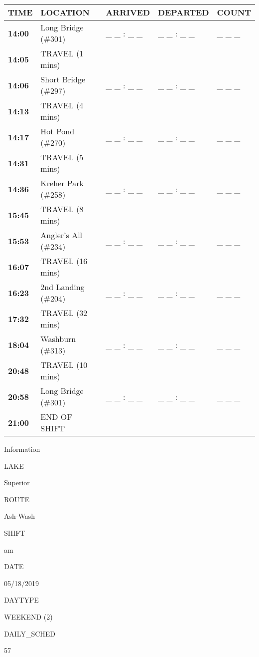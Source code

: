 \documentclass[]{article}
\begin{document}
\begin{tabular}{>{\bfseries}lllll}
\toprule
\textbf{TIME} & \textbf{LOCATION} & \textbf{ARRIVED} & \textbf{DEPARTED} & \textbf{COUNT}\\
\midrule
14:00 & Long Bridge (\#301) & \_ \_ : \_ \_ & \_ \_ : \_ \_ & \_ \_ \_\\
14:05 & TRAVEL (1 mins) &  &  & \\
14:06 & Short Bridge (\#297) & \_ \_ : \_ \_ & \_ \_ : \_ \_ & \_ \_ \_\\
14:13 & TRAVEL (4 mins) &  &  & \\
14:17 & Hot Pond (\#270) & \_ \_ : \_ \_ & \_ \_ : \_ \_ & \_ \_ \_\\
14:31 & TRAVEL (5 mins) &  &  & \\
14:36 & Kreher Park (\#258) & \_ \_ : \_ \_ & \_ \_ : \_ \_ & \_ \_ \_\\
15:45 & TRAVEL (8 mins) &  &  & \\
15:53 & Angler's All (\#234) & \_ \_ : \_ \_ & \_ \_ : \_ \_ & \_ \_ \_\\
16:07 & TRAVEL (16 mins) &  &  & \\
16:23 & 2nd Landing (\#204) & \_ \_ : \_ \_ & \_ \_ : \_ \_ & \_ \_ \_\\
17:32 & TRAVEL (32 mins) &  &  & \\
18:04 & Washburn (\#313) & \_ \_ : \_ \_ & \_ \_ : \_ \_ & \_ \_ \_\\
20:48 & TRAVEL (10 mins) &  &  & \\
20:58 & Long Bridge (\#301) & \_ \_ : \_ \_ & \_ \_ : \_ \_ & \_ \_ \_\\
21:00 & END OF SHIFT &  &  & \\
\bottomrule
\end{tabular}\newpage

Information

LAKE

Superior

ROUTE

Ash-Wash

SHIFT

am

DATE

05/18/2019

DAYTYPE

WEEKEND (2)

DAILY\_SCHED

57

\vspace{24pt}
\end{document}
